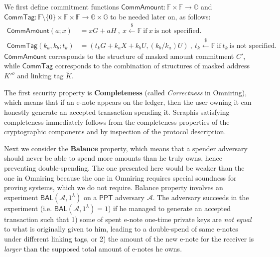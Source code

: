 \documentclass{article}
\begin{document}
We first define commitment functions $\textsf{CommAmount}:\mathbb{F}\times\mathbb{F}\rightarrow\mathbb{G}$ and $\textsf{CommTag}:\mathbb{F}\setminus\{0\}\times\mathbb{F}\times\mathbb{F}\rightarrow\mathbb{G}\times\mathbb{G}$ to be needed later on, as follows:
\begin{align*}
\textsf{CommAmount}(a; x) &= x G + a H \ , \ x\xleftarrow{\$}\mathbb{F}\ \text{if}\ x\ \text{is not specified.} \\
\textsf{CommTag}(k_a, k_b; t_k) &= (t_k G + k_a X + k_b U, (k_b/k_a)U)\ , \ t_k\xleftarrow{\$}\mathbb{F}\ \text{if}\ t_k\ \text{is not specified.}
\end{align*}
$\textsf{CommAmount}$ corresponds to the structure of masked amount commitment $C'$, while $\textsf{CommTag}$ corresponds to the combination of structures of masked address $K'^o$ and linking tag $\tilde{K}$.

The first security property is \textbf{Completeness} (called \textit{Correctness} in Omniring), which means that if an e-note appears on the ledger, then the user owning it can honestly generate an accepted transaction spending it. Seraphis satisfying completeness immediately follows from the completeness properties of the cryptographic components and by inspection of the protocol description.

Next we consider the \textbf{Balance} property, which means that a spender adversary should never be able to spend more amounts than he truly owns, hence preventing double-spending. The one presented here would be weaker than the one in Omniring because the one in Omniring requires special soundness for proving systems, which we do not require. Balance property involves an experiment $\textsf{BAL}(\mathcal{A}, 1^{\lambda})$  on a $\textsf{PPT}$ adversary $\mathcal{A}$. The adversary succeeds in the experiment (i.e. $\textsf{BAL}(\mathcal{A}, 1^{\lambda})=1$) if he managed to generate an accepted transaction such that 1) some of spent e-note one-time private keys are \textit{not equal} to what is originally given to him, leading to a double-spend of same e-notes under different linking tags, or 2) the amount of the new e-note for the receiver is \textit{larger} than the supposed total amount of e-notes he owns.
\end{document}
